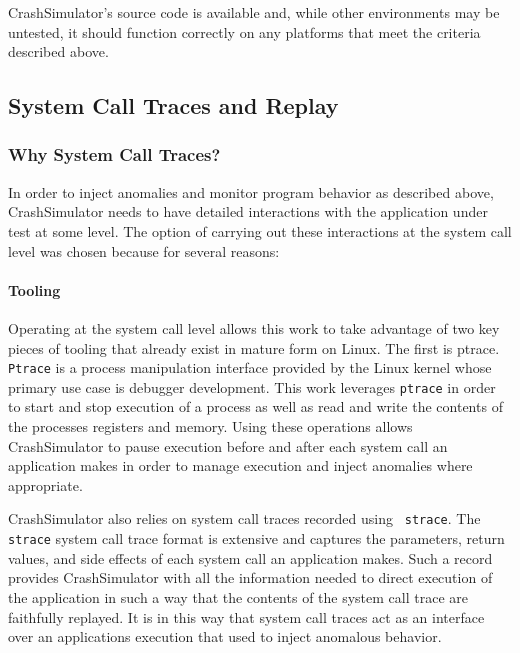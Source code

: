     CrashSimulator's source code is available and, while other environments may
    be untested, it should function correctly on any platforms that meet the
    criteria described above.

    \subsection{System Call Traces and Replay}

        \subsubsection{Why System Call Traces?}

        In order to inject anomalies and monitor program behavior as described
        above, CrashSimulator needs to have detailed interactions with the
        application under test at some level.  The option of carrying out these
        interactions at the system call level was chosen because for several
        reasons:

        \paragraph{Tooling}

        Operating at the system call level allows this work to take advantage of
        two key pieces of tooling that already exist in mature form on Linux.
        The first is ptrace. {\tt Ptrace} is a process manipulation interface provided
        by the Linux kernel whose primary use case is debugger development.
        This work leverages {\tt ptrace} in order to start and stop execution of a
        process as well as read and write the contents of the processes
        registers and memory.  Using these operations allows CrashSimulator to
        pause execution before and after each system call an application makes
        in order to manage execution and inject anomalies where appropriate.

        CrashSimulator also relies on system call traces recorded using {\tt
          strace}.  The {\tt strace} system call trace format is extensive and
        captures the parameters, return values, and side effects of each system
        call an application makes.  Such a record provides CrashSimulator with
        all the information needed to direct execution of the application in
        such a way that the contents of the system call trace are faithfully
        replayed.  It is in this way that system call traces act as an interface
        over an applications execution that used to inject anomalous behavior.

